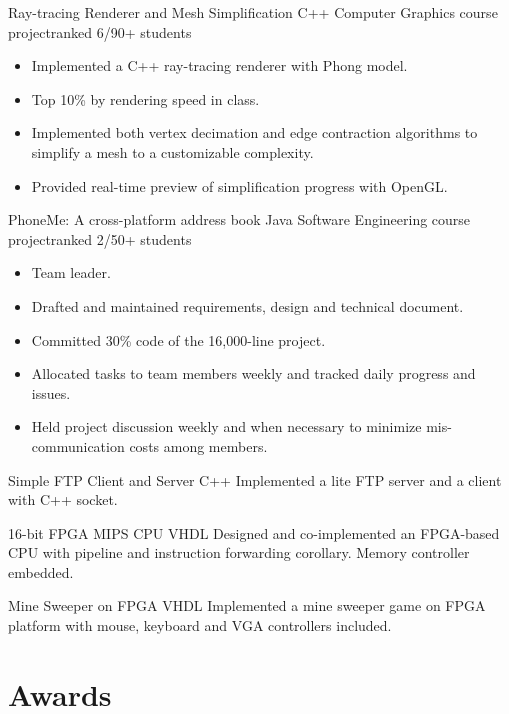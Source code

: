 \documentclass[10pt,a4paper]{moderncv/moderncv}
\begin{document}
{Ray-tracing Renderer and Mesh Simplification}
{C++}
{Computer Graphics course project}{ranked 6/90+ students}
{{
\begin{itemize}
	\item Implemented a C++ ray-tracing renderer with Phong model.
	\item Top 10\% by rendering speed in class.
	\item Implemented both vertex decimation and edge contraction algorithms to simplify a mesh to a customizable complexity.
	\item Provided real-time preview of simplification progress with OpenGL.
\end{itemize}}
}

{PhoneMe: A cross-platform address book}
{Java}
{Software Engineering course project}{ranked 2/50+ students}
{
\begin{itemize}
	\item Team leader.
	\item Drafted and maintained requirements, design and technical document.
	\item Committed 30\% code of the 16,000-line project.
	\item Allocated tasks to team members weekly and tracked daily progress and issues.
	\item Held project discussion weekly and when necessary to minimize mis-communication costs among members.
\end{itemize}
}

{Simple FTP Client and Server}
{C++}
{}{}
{
Implemented a lite FTP server and a client with C++ socket.
}

{16-bit FPGA MIPS CPU}
{VHDL}
{}{}
{
Designed and co-implemented an FPGA-based CPU with pipeline and instruction forwarding corollary. Memory controller embedded.
}

{Mine Sweeper on FPGA}
{VHDL}
{}{}
{
Implemented a mine sweeper game on FPGA platform with mouse, keyboard and VGA controllers included.
}



\nocite{*}


\section{Awards}
\end{document}
